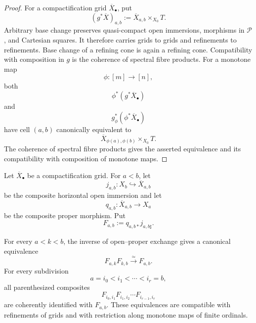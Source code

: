 \begin{proof}
For a compactification grid \(\overline X_\bullet\), put
\[
    (g^*\overline X)_{a,b}
    :=
    \overline X_{a,b}\times_{X_0}T.
\]
Arbitrary base change preserves quasi-compact open immersions, morphisms in
\(\mathcal P\), and Cartesian squares.  It therefore carries grids to grids
and refinements to refinements.  Base change of a refining cone is again a
refining cone.  Compatibility with composition in \(g\) is the coherence of
spectral fibre products.  For a monotone map
\[
    \phi:[m]\longrightarrow[n],
\]
both
\[
    \phi^*(g^*\overline X_\bullet)
\]
and
\[
    g_\phi^*(\phi^*\overline X_\bullet)
\]
have cell \((a,b)\) canonically equivalent to
\[
    \overline X_{\phi(a),\phi(b)}
    \times_{X_0}T.
\]
The coherence of spectral fibre products gives the asserted equivalence and
its compatibility with composition of monotone maps.
\end{proof}

\begin{proposition}
\label{prop:finite-grid-composition-formula}
Let \(\overline X_\bullet\) be a compactification grid.  For \(a<b\), let
\[
    j_{a,b}:
    X_b
    \hookrightarrow
    \overline X_{a,b}
\]
be the composite horizontal open immersion and let
\[
    q_{a,b}:
    \overline X_{a,b}
    \longrightarrow
    X_a
\]
be the composite proper morphism.  Put
\[
    F_{a,b}
    :=
    q_{a,b*}j_{a,b\sharp}.
\]

For every \(a<k<b\), the inverse of open--proper exchange gives a canonical
equivalence
\[
    F_{a,k}F_{k,b}
    \xrightarrow{\simeq}
    F_{a,b}.
\]
For every subdivision
\[
    a=i_0<i_1<\cdots<i_r=b,
\]
all parenthesized composites
\[
    F_{i_0,i_1}
    F_{i_1,i_2}
    \cdots
    F_{i_{r-1},i_r}
\]
are coherently identified with \(F_{a,b}\).  These equivalences are
compatible with refinements of grids and with restriction along monotone
maps of finite ordinals.
\end{proposition}

